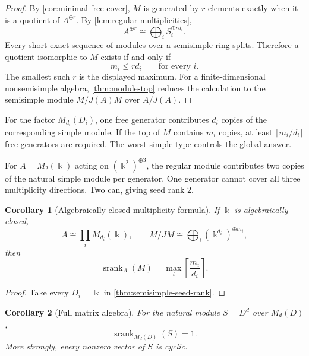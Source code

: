\documentclass[11pt]{article}
\newtheorem{corollary}[corollary]{Corollary}
\theoremstyle{definition}
\theoremstyle{remark}
\theoremstyle{definition}\newtheorem{example}[theorem]{Example}
\newcommand{\bbk}{\Bbbk}
\newcommand{\srank}{\operatorname{srank}}
\newcommand{\RecordID}[1]{\label{record:#1}}
\newcommand{\Depends}[1]{}
\begin{document}
\begin{proof}
By \cref{cor:minimal-free-cover}, $M$ is generated by $r$ elements exactly when it is a quotient of $A^{\oplus r}$.  By \cref{lem:regular-multiplicities},
\[
A^{\oplus r}\cong\bigoplus_iS_i^{\oplus rd_i}.
\]
Every short exact sequence of modules over a semisimple ring splits.  Therefore a quotient isomorphic to $M$ exists if and only if
\[
m_i\leq rd_i
\qquad\text{for every }i.
\]
The smallest such $r$ is the displayed maximum.  For a finite-dimensional nonsemisimple algebra, \cref{thm:module-top} reduces the calculation to the semisimple module $M/J(A)M$ over $A/J(A)$.
\end{proof}

\begin{interpretation}
For the factor \(M_{d_i}(D_i)\), one free generator contributes \(d_i\) copies of the corresponding simple module.  If the top of \(M\) contains \(m_i\) copies, at least \(\lceil m_i/d_i\rceil\) free generators are required.  The worst simple type controls the global answer.
\end{interpretation}

\begin{microexample}[title={Multiplicity consumes seed capacity}]
For \(A=M_2(\bbk)\) acting on \((\bbk^2)^{\oplus3}\), the regular module contributes two copies of the natural simple module per generator.  One generator cannot cover all three multiplicity directions.  Two can, giving seed rank \(2\).
\end{microexample}


\begin{corollary}[Algebraically closed multiplicity formula]
\label{cor:algebraically-closed-formula}
If $\bbk$ is algebraically closed,
\[
A\cong\prod_iM_{d_i}(\bbk),
\qquad
M/JM\cong\bigoplus_i(\bbk^{d_i})^{\oplus m_i},
\]
then
\[
\srank_A(M)=\max_i\left\lceil\frac{m_i}{d_i}\right\rceil.
\]
\end{corollary}
\RecordID{PSC-I-C-ALGEBRAICALLY-CLOSED-FORMULA}
\Depends{PSC-I-T-SEMISIMPLE-SEED-RANK.}

\begin{proof}
Take every $D_i=\bbk$ in \cref{thm:semisimple-seed-rank}.
\end{proof}

\begin{corollary}[Full matrix algebra]
\label{cor:full-matrix}
For the natural module $S=D^d$ over $M_d(D)$,
\[
\srank_{M_d(D)}(S)=1.
\]
More strongly, every nonzero vector of $S$ is cyclic.
\end{corollary}
\RecordID{PSC-I-C-FULL-MATRIX}
\Depends{PSC-I-T-SEMISIMPLE-SEED-RANK.}
\end{document}
